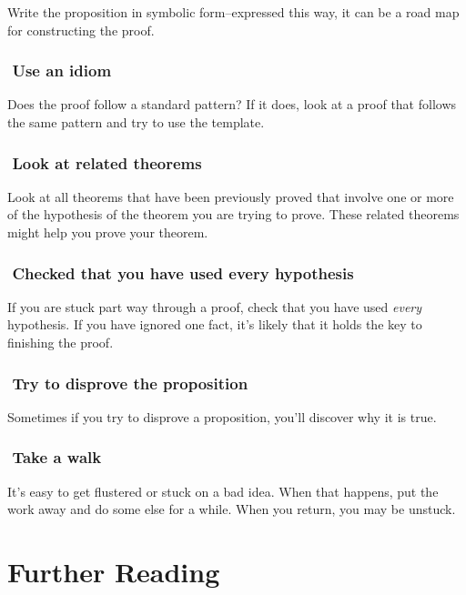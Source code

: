 \documentclass[12pt]{article}
\newcounter{ex}\setcounter{ex}{0}
\newcounter{id}\setcounter{id}{0}
\newcommand{\id}{%
\hspace{-0.2in} \setcounter{id}{\value{id}+1}
\theid \,\,}
\newcounter{se}\setcounter{se}{0}
\begin{document}
Write the proposition in symbolic form--expressed this way, it can be a road map for constructing the proof.

\subsubsection*{\id Use an idiom}

Does the proof follow a standard pattern?  If it does, look at a proof that
follows the same pattern and try to use the template.


\subsubsection*{\id Look at related theorems}

Look at all theorems that have been previously proved that involve one or
more of the hypothesis of the theorem you are trying to prove.  These
related theorems might help you prove your theorem.

\subsubsection*{\id Checked that you have used every hypothesis}

If you are stuck part way through a proof, check that you have
used {\em every\/} hypothesis.  If you have ignored one fact,  it's likely
that it holds the key to finishing the proof.

\subsubsection*{\id Try to disprove the proposition}

Sometimes if you try to disprove a proposition, you'll discover why
it is true.

\subsubsection*{\id Take a walk}

It's easy to get flustered or stuck on a bad idea.  When that happens,
put the work away and do some else for a while.  When you return, you may
be unstuck.


\section*{Further Reading}
\end{document}
